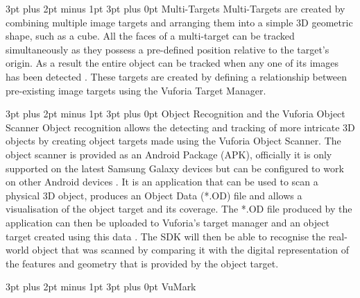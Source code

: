 \documentclass[12pt,a4paper,oneside]{article}
\makeatletter
\renewcommand\paragraph{\@startsection {paragraph}{1}{0mm} %
	                           {3pt plus 2pt minus 1pt} %
	                           {3pt plus 0pt} %
	                           {\normalfont}}
\makeatother
\begin{document}
\paragraph{Multi-Targets}
Multi-Targets are created by combining multiple image targets and arranging them into a simple 3D geometric shape, such as a cube. All the faces of a multi-target can be tracked simultaneously as they possess a pre-defined position relative to the target's origin. As a result the entire object can be tracked when any one of its images has been detected  \cite{vuforiamultitargets}. These targets are created by defining a relationship between pre-existing image targets using the Vuforia Target Manager.

\paragraph{Object Recognition and the Vuforia Object Scanner}
Object recognition allows the detecting and tracking of more intricate 3D objects by creating object targets made using the Vuforia Object Scanner. The object scanner is provided as an Android Package (APK), officially it is only supported on the latest Samsung Galaxy devices but can be configured to work on other Android devices \cite{vuforiasupportedversions}. It is an application that can be used to scan a physical 3D object, produces an Object Data (*.OD) file and allows a visualisation of the object target and its coverage. The *.OD file produced by the application can then be uploaded to Vuforia's target manager and an object target created using this data \cite{vuforiaobjectreco}. The SDK will then be able to recognise the real-world object that was scanned by comparing it with the digital representation of the features and geometry that is provided by the object target.

\paragraph{VuMark}
\end{document}
